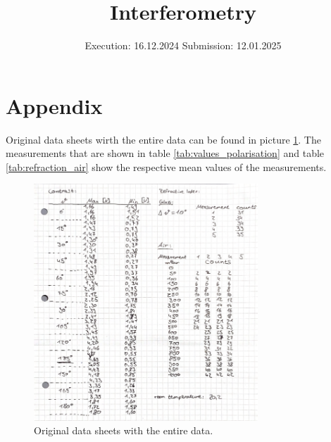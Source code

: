 

\subject{v64}
\title{Interferometry}
\date{%
  Execution: 16.12.2024
  \hspace{3em}
  Submission: 12.01.2025
}



\maketitle
\thispagestyle{empty}
\tableofcontents
\newpage






\printbibliography{}

\appendix
\newpage

\section{Appendix}
\label{sec:appendix}

Original data sheets wirth the entire data can be found in picture \ref{fig:original_data}.
The measurements that are shown in table \ref{tab:values_polarisation} and table \ref{tab:refraction_air} show the respective mean values of the measurements.

\begin{figure}[H]
    \centering
    \includegraphics[width=0.75\textwidth]{./data/Messwerte.png}
    \caption{Original data sheets with the entire data.}
    \label{fig:original_data}
\end{figure}



